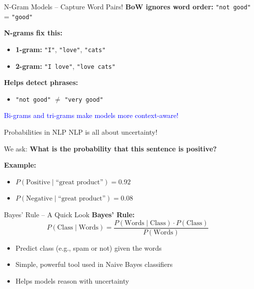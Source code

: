 \begin{frame}{N-Gram Models – Capture Word Pairs!}
    \textbf{BoW ignores word order:} \texttt{"not good"} = \texttt{"good"}

    \vspace{1em}
    \textbf{N-grams fix this:}
    \begin{itemize}
        \item \textbf{1-gram:} \texttt{"I"}, \texttt{"love"}, \texttt{"cats"}
        \item \textbf{2-gram:} \texttt{"I love"}, \texttt{"love cats"}
    \end{itemize}

    \vspace{1em}
    \textbf{Helps detect phrases:}
    \begin{itemize}
        \item \texttt{"not good"} $\neq$ \texttt{"very good"}
    \end{itemize}

    \vspace{1em}
    \textcolor{blue}{\faLightbulbO\enspace Bi-grams and tri-grams make models more context-aware!}
\end{frame}

\begin{frame}{Probabilities in NLP}
    NLP is all about uncertainty!

    \vspace{1em}
    We ask: \textbf{What is the probability that this sentence is positive?}

    \vspace{1em}
    \textbf{Example:}
    \begin{itemize}
        \item $P(\text{Positive} \mid \text{``great product''}) = 0.92$
        \item $P(\text{Negative} \mid \text{``great product''}) = 0.08$
    \end{itemize}
\end{frame}

\begin{frame}{Bayes’ Rule – A Quick Look}
    \textbf{Bayes’ Rule:}
    \[
        P(\text{Class} \mid \text{Words}) = \frac{P(\text{Words} \mid \text{Class}) \cdot P(\text{Class})}{P(\text{Words})}
    \]
    \vspace{1em}
    \begin{itemize}
        \item Predict class (e.g., spam or not) given the words
        \item Simple, powerful tool used in Naive Bayes classifiers
        \item Helps models reason with uncertainty
    \end{itemize}
\end{frame}

